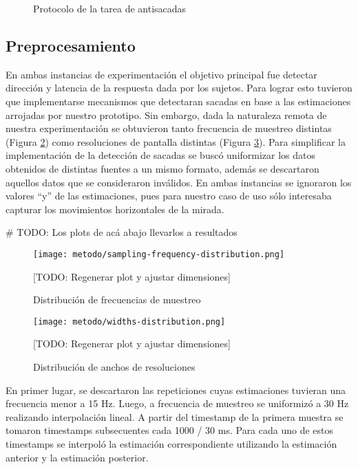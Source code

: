 \begin{figure}
    \centering
    \caption{Protocolo de la tarea de antisacadas}
    \label{fig:antisaccades-protocol}
\end{figure}

\subsection{Preprocesamiento} \label{section:preprocessing}

En ambas instancias de experimentación el objetivo principal fue detectar
dirección y latencia de la respuesta dada por los sujetos.
Para lograr esto tuvieron que implementarse mecanismos que detectaran sacadas
en base a las estimaciones arrojadas por nuestro prototipo.
Sin embargo, dada la naturaleza remota de nuestra experimentación se obtuvieron
tanto frecuencia de muestreo distintas (Figura
\ref{fig:sampling-frequency-distribution}) como resoluciones de pantalla
distintas (Figura \ref{fig:widths-distribution}).
Para simplificar la implementación de la detección de sacadas se buscó
uniformizar los datos obtenidos de distintas fuentes a un mismo formato, además
se descartaron aquellos datos que se consideraron inválidos.
En ambas instancias se ignoraron los valores “y” de las estimaciones, pues para
nuestro caso de uso sólo interesaba capturar los movimientos horizontales de la
mirada.

# TODO: Los plots de acá abajo llevarlos a resultados

\begin{figure}
  \centering
  \texttt{[image: metodo/sampling-frequency-distribution.png]}
  \caption{Distribución de frecuencias de muestreo}
  [TODO: Regenerar plot y ajustar dimensiones]
  \label{fig:sampling-frequency-distribution}
\end{figure}

\begin{figure}
  \centering
  \texttt{[image: metodo/widths-distribution.png]}
  \caption{Distribución de anchos de resoluciones}
  [TODO: Regenerar plot y ajustar dimensiones]
  \label{fig:widths-distribution}
\end{figure}

En primer lugar, se descartaron las repeticiones cuyas estimaciones tuvieran
una frecuencia menor a 15 Hz.
Luego, a frecuencia de muestreo se uniformizó a 30 Hz realizando interpolación
lineal.
A partir del timestamp de la primera muestra se tomaron timestamps subsecuentes
cada 1000 / 30 ms.
Para cada uno de estos timestamps se interpoló la estimación correspondiente
utilizando la estimación anterior y la estimación posterior. 

